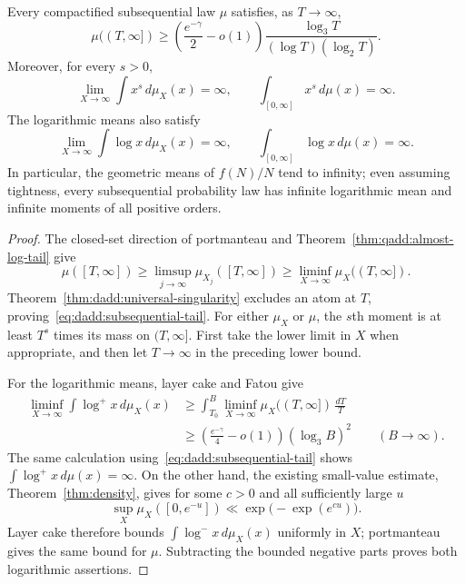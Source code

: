 \begin{corollary}
\label{cor:dadd:subsequential-tails}
Every compactified subsequential law $\mu$ satisfies, as
$T\to\infty$,
\begin{equation}
\label{eq:dadd:subsequential-tail}
 \mu((T,\infty])
 \geq\left(\frac{e^{-\gamma}}2-o(1)\right)
       \frac{\log_3T}{(\log T)(\log_2T)}.
\end{equation}
Moreover, for every $s>0$,
\[
 \lim_{X\to\infty}\int x^s\,d\mu_X(x)=\infty,
 \qquad
 \int_{[0,\infty]}x^s\,d\mu(x)=\infty.
\]
The logarithmic means also satisfy
\[
 \lim_{X\to\infty}\int\log x\,d\mu_X(x)=\infty,
 \qquad
 \int_{[0,\infty]}\log x\,d\mu(x)=\infty.
\]
In particular, the geometric means of $f(N)/N$ tend to infinity;
even assuming tightness, every subsequential probability law has
infinite logarithmic mean and infinite moments of all positive orders.
\end{corollary}

\begin{proof}
The closed-set direction of portmanteau and
Theorem~\ref{thm:qadd:almost-log-tail} give
\[
 \mu([T,\infty])
 \geq\limsup_{j\to\infty}\mu_{X_j}([T,\infty])
 \geq\liminf_{X\to\infty}\mu_X((T,\infty]).
\]
Theorem~\ref{thm:dadd:universal-singularity} excludes an atom at
$T$, proving~\eqref{eq:dadd:subsequential-tail}. For either $\mu_X$
or $\mu$, the $s$th moment is at least $T^s$ times its mass on
$(T,\infty]$. First take the lower limit in $X$ when appropriate,
and then let $T\to\infty$ in the preceding lower bound.

For the logarithmic means, layer cake and Fatou give
\begin{align*}
 \liminf_{X\to\infty}\int\log^+x\,d\mu_X(x)
 &\geq\int_{T_0}^B
       \liminf_{X\to\infty}\mu_X((T,\infty])\,\frac{dT}{T}\\
 &\geq\left(\frac{e^{-\gamma}}4-o(1)\right)
           (\log_3B)^2
 \qquad(B\to\infty).
\end{align*}
The same calculation using~\eqref{eq:dadd:subsequential-tail}
shows $\int\log^+x\,d\mu(x)=\infty$. On the other hand, the
existing small-value estimate, Theorem~\ref{thm:density}, gives
for some $c>0$ and all sufficiently large $u$
\[
 \sup_X\mu_X([0,e^{-u}])
 \ll\exp\bigl(-\exp(e^{cu})\bigr).
\]
Layer cake therefore bounds $\int\log^-x\,d\mu_X(x)$ uniformly
in $X$; portmanteau gives the same bound for $\mu$.
Subtracting the bounded negative parts proves both logarithmic
assertions.
\end{proof}

